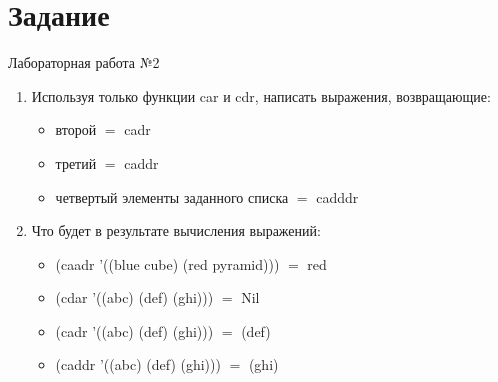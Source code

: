 \newpage
\section*{Задание}
\Large{Лабораторная работа №2}

\begin{enumerate}
	\item Используя только функции car и cdr, написать выражения, возвращающие:
	\begin{itemize}
		\item второй $=$ cadr
		\item третий $=$ caddr
		\item четвертый элементы заданного списка $=$ cadddr
	\end{itemize}
	\item Что будет в результате вычисления выражений:
	\begin{itemize}
		\item (caadr '((blue cube) (red pyramid))) $=$ red
		\item (cdar '((abc) (def) (ghi))) $=$ Nil
		\item (cadr '((abc) (def) (ghi))) $=$ (def)
		\item (caddr '((abc) (def) (ghi))) $=$ (ghi)
	\end{itemize}
\end{enumerate}